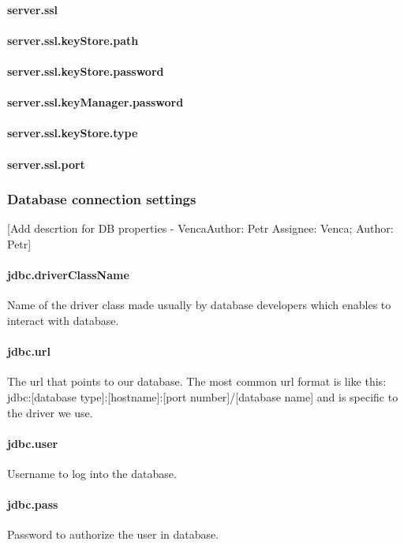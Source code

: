 \documentclass[12pt,a4paper]{report}
\makeatletter
\newcommand{\comment}[3][\@empty]{
  {\color{magenta}[#3 - }
  {\color{green}\ifx\@empty#1\relax Author: #2 \else Assignee: #1; Author: #2\fi}{\color{magenta}]}
}
\makeatother
\begin{document}
\paragraph{server.ssl}
\paragraph{server.ssl.keyStore.path}
\paragraph{server.ssl.keyStore.password}
\paragraph{server.ssl.keyManager.password}
\paragraph{server.ssl.keyStore.type}
\paragraph{server.ssl.port}

\subsubsection{Database connection settings}
\comment[Venca]{Petr}{Add descrtion for DB properties}
\paragraph{jdbc.driverClassName}
Name of the driver class made usually by database developers which enables to interact with database.

\paragraph{jdbc.url}
 The url that points to our database. The most common url format is like this:
jdbc:[database type]:[hostname]:[port number]/[database name]
and is specific to the driver we use.

\paragraph{jdbc.user}
Username to log into the database.
\paragraph{jdbc.pass}
Password to authorize the user in database.
\end{document}
